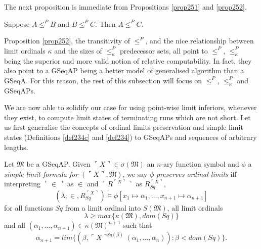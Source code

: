 \documentclass[12pt]{article}
\numberwithin{equation}{section}
\begin{document}
The next proposition is immediate from Propositions \ref{prop251} and \ref{prop252}.

\begin{prop}
Suppose $A \leq^P B$ and $B \leq^P C$. Then $A \leq^P C$.
\end{prop} 

Proposition \ref{prop252}, the transitivity of $\leq^P$, and the nice relationship between limit ordinals $\kappa$ and the sizes of $\leq^P_{\kappa}$ predecessor sets, all point to $\leq^P$, $\leq^P_{\kappa}$ being the superior and more valid notion of relative computability. In fact, they also point to a GSeqAP being a better model of generalised algorithm than a GSeqA. For this reason, the rest of this subsection will focus on $\leq^P$, $\leq^P_{\kappa}$ and GSeqAPs.

We are now able to solidify our case for using point-wise limit inferiors, whenever they exist, to compute limit states of terminating runs which are not short. Let us first generalise the concepts of ordinal limits preservation and simple limit states (Definitions \ref{def234c} and \ref{def234}) to GSeqAPs and sequences of arbitrary lengths.

\begin{defi}\label{257c}
Let $\mathfrak{M}$ be a GSeqAP. Given $\ulcorner X \urcorner \in \sigma(\mathfrak{M})$ an $n$-ary function symbol and $\phi$ a \emph{simple limit formula for} $(\ulcorner X \urcorner, \mathfrak{M})$, we say $\phi$ \emph{preserves ordinal limits} iff interpreting $\ulcorner \in \urcorner$ as $\in$ and $\ulcorner R^{\ulcorner X \urcorner} \urcorner$ as $R_{Sq}^{\ulcorner X \urcorner}$, 
\begin{equation*}
    (\lambda; \in, R_{Sq}^{\ulcorner X \urcorner}) \models \phi[x_1 \mapsto \alpha_1, \dots, x_{n+1} \mapsto \alpha_{n+1}]
\end{equation*}
for all functions $Sq$ from a limit ordinal into $S(\mathfrak{M})$, all limit ordinals 
\begin{equation*}
    \lambda \geq max\{\kappa(\mathfrak{M}), dom(Sq)\}
\end{equation*}
and all $(\alpha_1, \dots, \alpha_{n+1}) \in \kappa(\mathfrak{M})^{n+1}$ such that 
\begin{equation*}
    \alpha_{n+1} = lim \{(\beta, \ulcorner X \urcorner^{Sq(\beta)}(\alpha_1, \dots, \alpha_n)) : \beta < dom(Sq)\} \text{.}
\end{equation*}
\end{defi}
\end{document}

